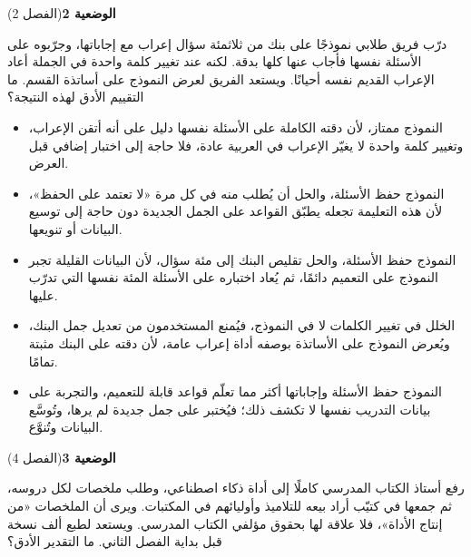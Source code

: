 \documentclass[11pt,a4paper]{article}
\begin{document}
\par\vspace{6pt}
\noindent
{\large\khatt\textbf{الوضعية 2}}\hfill{\small(الفصل 2)}\par\nopagebreak\vspace{3pt}
\setlength{\fboxsep}{7pt}\colorbox{gray!10}{\parbox{\dimexpr\linewidth-14pt}{درّب فريق طلابي نموذجًا على بنك من ثلاثمئة سؤال إعراب مع إجاباتها، وجرّبوه على الأسئلة نفسها فأجاب عنها كلها بدقة. لكنه عند تغيير كلمة واحدة في الجملة أعاد الإعراب القديم نفسه أحيانًا. ويستعد الفريق لعرض النموذج على أساتذة القسم. ما التقييم الأدق لهذه النتيجة؟}}\par\nopagebreak
\begin{itemize}[leftmargin=1.0cm, labelsep=6pt, itemsep=3pt, topsep=4pt, parsep=0pt]
  \item[\textbf{أ)}] النموذج ممتاز، لأن دقته الكاملة على الأسئلة نفسها دليل على أنه أتقن الإعراب، وتغيير كلمة واحدة لا يغيّر الإعراب في العربية عادة، فلا حاجة إلى اختبار إضافي قبل العرض.
  \item[\textbf{ب)}] النموذج حفظ الأسئلة، والحل أن يُطلب منه في كل مرة «لا تعتمد على الحفظ»، لأن هذه التعليمة تجعله يطبّق القواعد على الجمل الجديدة دون حاجة إلى توسيع البيانات أو تنويعها.
  \item[\textbf{ج)}] النموذج حفظ الأسئلة، والحل تقليص البنك إلى مئة سؤال، لأن البيانات القليلة تجبر النموذج على التعميم دائمًا، ثم يُعاد اختباره على الأسئلة المئة نفسها التي تدرّب عليها.
  \item[\textbf{د)}] الخلل في تغيير الكلمات لا في النموذج، فيُمنع المستخدمون من تعديل جمل البنك، ويُعرض النموذج على الأساتذة بوصفه أداة إعراب عامة، لأن دقته على البنك مثبتة تمامًا.
  \item[\textbf{هـ)}] النموذج حفظ الأسئلة وإجاباتها أكثر مما تعلّم قواعد قابلة للتعميم، والتجربة على بيانات التدريب نفسها لا تكشف ذلك؛ فيُختبر على جمل جديدة لم يرها، وتُوسَّع البيانات وتُنوَّع.
\end{itemize}
\par\vspace{6pt}
\noindent
{\large\khatt\textbf{الوضعية 3}}\hfill{\small(الفصل 4)}\par\nopagebreak\vspace{3pt}
\setlength{\fboxsep}{7pt}\colorbox{gray!10}{\parbox{\dimexpr\linewidth-14pt}{رفع أستاذ الكتاب المدرسي كاملًا إلى أداة ذكاء اصطناعي، وطلب ملخصات لكل دروسه، ثم جمعها في كتيّب أراد بيعه للتلاميذ وأوليائهم في المكتبات. ويرى أن الملخصات «من إنتاج الأداة»، فلا علاقة لها بحقوق مؤلفي الكتاب المدرسي. ويستعد لطبع ألف نسخة قبل بداية الفصل الثاني. ما التقدير الأدق؟}}\par\nopagebreak
\end{document}

